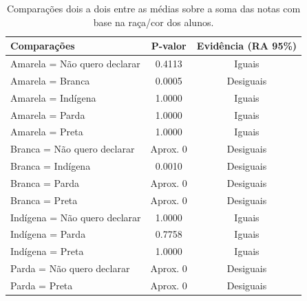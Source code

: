 \newpage
\begin{table}[htb]
    \centering
\caption{Comparações dois a dois entre as médias sobre a soma das notas
        com base na raça/cor dos alunos.}
    \begin{tabular}{lcc}
    \toprule
    Comparações & P-valor & Evidência (RA 95\%)\\
    \midrule \midrule
    Amarela = Não quero declarar & 0.4113 & Iguais\\
    Amarela = Branca & 0.0005 & Desiguais\\
    Amarela = Indígena & 1.0000 & Iguais\\
    Amarela = Parda & 1.0000 & Iguais\\
    Amarela = Preta & 1.0000 & Iguais\\
    Branca = Não quero declarar & Aprox. 0 & Desiguais\\
    Branca = Indígena & 0.0010 & Desiguais\\
    Branca = Parda & Aprox. 0 & Desiguais\\
    Branca = Preta & Aprox. 0 & Desiguais\\
    Indígena = Não quero declarar & 1.0000 & Iguais\\
    Indígena = Parda & 0.7758 & Iguais\\
    Indígena = Preta & 1.0000  & Iguais\\
    Parda = Não quero declarar & Aprox. 0 & Desiguais\\
    Parda = Preta & Aprox. 0 & Desiguais\\
    \bottomrule
    \end{tabular}
    \centering
    
\end{table}


